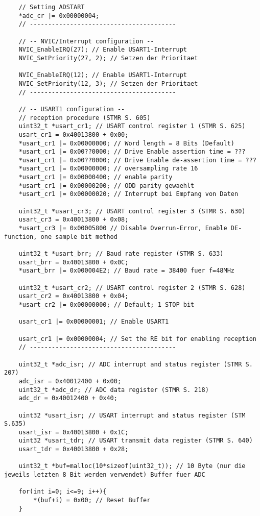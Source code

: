 \documentclass[11pt]{report}
\begin{document}
\begin{lstlisting}
	// Setting ADSTART
	*adc_cr |= 0x00000004;
	// ----------------------------------------

	// -- NVIC/Interrupt configuration --
	NVIC_EnableIRQ(27); // Enable USART1-Interrupt
	NVIC_SetPriority(27, 2); // Setzen der Prioritaet

	NVIC_EnableIRQ(12); // Enable USART1-Interrupt
	NVIC_SetPriority(12, 3); // Setzen der Prioritaet
	// ----------------------------------------

	// -- USART1 configuration --
	// reception procedure (STMR S. 605)
	uint32_t *usart_cr1; // USART control register 1 (STMR S. 625)
	usart_cr1 = 0x40013800 + 0x00;
	*usart_cr1 |= 0x00000000; // Word length = 8 Bits (Default)
	*usart_cr1 |= 0x00??0000; // Drive Enable assertion time = ???
	*usart_cr1 |= 0x00??0000; // Drive Enable de-assertion time = ???
	*usart_cr1 |= 0x00000000; // oversampling rate 16
	*usart_cr1 |= 0x00000400; // enable parity
	*usart_cr1 |= 0x00000200; // ODD parity gewaehlt
	*usart_cr1 |= 0x00000020; // Interrupt bei Empfang von Daten

	uint32_t *usart_cr3; // USART control register 3 (STMR S. 630)
	usart_cr3 = 0x40013800 + 0x08;
	*usart_cr3 |= 0x00005800 // Disable Overrun-Error, Enable DE-function, one sample bit method

	uint32_t *usart_brr; // Baud rate register (STMR S. 633)
	usart_brr = 0x40013800 + 0x0C;
	*usart_brr |= 0x000004E2; // Baud rate = 38400 fuer f=48MHz

	uint32_t *usart_cr2; // USART control register 2 (STMR S. 628)
	usart_cr2 = 0x40013800 + 0x04;
	*usart_cr2 |= 0x00000000; // Default; 1 STOP bit

	usart_cr1 |= 0x00000001; // Enable USART1

	usart_cr1 |= 0x00000004; // Set the RE bit for enabling reception
	// ----------------------------------------

	uint32_t *adc_isr; // ADC interrupt and status register (STMR S. 207)
	adc_isr = 0x40012400 + 0x00;
	uint32_t *adc_dr; // ADC data register (STMR S. 218)
	adc_dr = 0x40012400 + 0x40;
	
	uint32 *usart_isr; // USART interrupt and status register (STM S.635)
	usart_isr = 0x40013800 + 0x1C;
	uint32 *usart_tdr; // USART transmit data register (STMR S. 640)
	usart_tdr = 0x40013800 + 0x28;

	uint32_t *buf=malloc(10*sizeof(uint32_t)); // 10 Byte (nur die jeweils letzten 8 Bit werden verwendet) Buffer fuer ADC

	for(int i=0; i<=9; i++){
		*(buf+i) = 0x00; // Reset Buffer
	}
	

\end{lstlisting}
\end{document}
